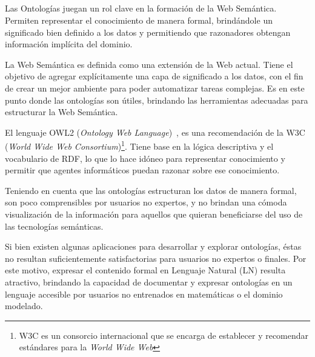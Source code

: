 \ \\
\ \\
\label{pagresum}
\\ \\
Las Ontologías juegan un rol clave en la formación de la Web Semántica. Permiten representar el conocimiento de manera formal, brindándole un significado bien definido a los datos y permitiendo que razonadores obtengan información implícita del dominio. 

La Web Semántica es definida como una extensión de la Web actual. Tiene el objetivo de agregar explícitamente una capa de significado a los datos, con el fin de crear un mejor ambiente para poder automatizar tareas complejas. Es en este punto donde las ontologías son útiles, brindando las herramientas adecuadas para estructurar la Web Semántica. 


El lenguaje OWL2 (\emph{Ontology Web Language})~\cite{RecomendW3C}, es una recomendación de la W3C (\emph{World Wide Web Consortium})\footnote{W3C es un consorcio internacional que se encarga de establecer y recomendar estándares para la \emph{World Wide Web}}. Tiene base en la lógica descriptiva y el vocabulario de RDF, lo que lo hace idóneo para representar conocimiento y permitir que agentes informáticos puedan razonar sobre ese conocimiento.

Teniendo en cuenta que las ontologías estructuran los datos de manera formal, son poco comprensibles por usuarios no expertos, y no brindan una cómoda visualización de la información para aquellos que quieran beneficiarse del uso de las tecnologías semánticas.

Si bien existen algunas aplicaciones para  desarrollar y explorar ontologías, éstas no resultan suficientemente satisfactorias para usuarios no expertos o finales. 
Por este motivo, expresar el contenido formal en Lenguaje Natural (LN) resulta atractivo, brindando la capacidad de documentar y expresar ontologías en un lenguaje accesible por usuarios no entrenados en matemáticas o el dominio modelado. 

